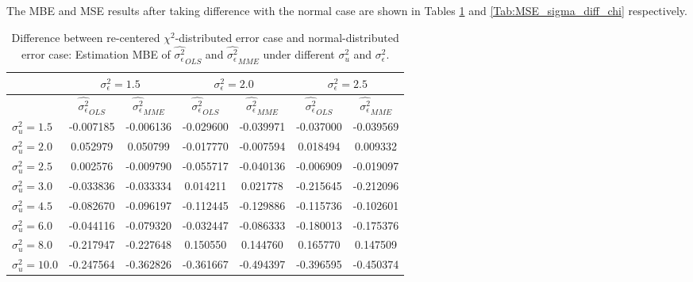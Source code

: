 \documentclass{article}
\begin{document}
The MBE and MSE results after taking difference with the normal case are shown in Tables \ref{Tab:MBE_sigma_diff_chi} and \ref{Tab:MSE_sigma_diff_chi} respectively. 

\begin{table}[ht]
    \centering
    \caption{Difference between re-centered $\chi^2$-distributed error case and normal-distributed error case: Estimation MBE of $\hat{\sigma^2_\epsilon}_{OLS}$ and $\hat{\sigma^2_\epsilon}_{MME}$ under different $\sigma^2_u$ and $\sigma^2_\epsilon$.}
    \label{Tab:MBE_sigma_diff_chi}
    \begin{tabular}[t]{lcccccc}
        \hline
        &\multicolumn{2}{c}{$\sigma^2_\epsilon=1.5$}&\multicolumn{2}{c}{$\sigma^2_\epsilon=2.0$}&\multicolumn{2}{c}{$\sigma^2_\epsilon=2.5$}\\
        \hline
        &$\hat{\sigma^2_\epsilon}_{OLS}$&$\hat{\sigma^2_\epsilon}_{MME}$&$\hat{\sigma^2_\epsilon}_{OLS}$&
        $\hat{\sigma^2_\epsilon}_{MME}$&$\hat{\sigma^2_\epsilon}_{OLS}$&$\hat{\sigma^2_\epsilon}_{MME}$\\
        \hline
        $\sigma^2_u = 1.5$&-0.007185&-0.006136&-0.029600&-0.039971&-0.037000&-0.039569\\
        $\sigma^2_u = 2.0$&0.052979&0.050799&-0.017770&-0.007594&0.018494&0.009332\\
        $\sigma^2_u = 2.5$&0.002576&-0.009790&-0.055717&-0.040136&-0.006909&-0.019097\\
        $\sigma^2_u = 3.0$&-0.033836&-0.033334&0.014211&0.021778&-0.215645&-0.212096\\
        $\sigma^2_u = 4.5$&-0.082670&-0.096197&-0.112445&-0.129886&-0.115736&-0.102601\\
        $\sigma^2_u = 6.0$&-0.044116&-0.079320&-0.032447&-0.086333&-0.180013&-0.175376\\
        $\sigma^2_u = 8.0$&-0.217947&-0.227648&0.150550&0.144760&0.165770&0.147509\\
        $\sigma^2_u = 10.0$&-0.247564&-0.362826&-0.361667&-0.494397&-0.396595&-0.450374\\
        \hline
    \end{tabular}
\end{table}
\end{document}
